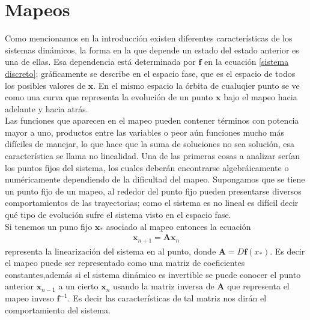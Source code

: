 \section{Mapeos}
Como mencionamos en la introducción existen diferentes características de los sistemas dinámicos, la forma en la que depende un estado del estado anterior es una de ellas. Esa dependencia está determinada por $\mathbf{f}$ en la ecuación \ref{sistema discreto}; gráficamente se describe en el espacio fase, que es el espacio de todos los posibles valores de $\pmb x$. En el mismo espacio la órbita de cualuqier punto se ve como una curva que representa la evolución de un punto $\pmb x$ bajo el mapeo hacia adelante y hacia atrás. \\

Las funciones que aparecen en el mapeo pueden contener términos con potencia mayor a uno, productos entre las variables o peor aún funciones mucho más difíciles de manejar, lo que hace que la suma de soluciones no sea solución, esa característica se llama no linealidad. Una de las primeras cosas a analizar serían los puntos fijos del sistema, los cuales deberán encontrarse algebráicamente o numéricamente dependiendo de la dificultad del mapeo. Supongamos que se tiene un punto fijo de un mapeo, al rededor del punto fijo pueden presentarse diversos comportamientos de las trayectorias; como el sistema es no lineal es difícil decir qué tipo de evolución sufre el sistema visto en el espacio fase.\\


Si tenemos un puno fijo $\pmb x_{*}$ asociado al mapeo entonces la ecuación
\begin{eqnarray}
\pmb x_{n+1} =\mathbf{A}\pmb x_{n}
\end{eqnarray}
representa la linearización del sistema en al punto, donde $\mathbf{A}=D\mathbf{f}(x_{*})$. Es decir el mapeo puede ser representado como una matriz de coeficientes constantes,además si el sistema dinámico es invertible se puede conocer el punto anterior $\pmb x_{n-1}$ a un cierto $\pmb x_{n}$ usando la matriz inversa de $\mathbf{A}$ que representa el mapeo inveso $\mathbf{f}^{-1}$. Es decir las características de tal matriz nos dirán el comportamiento del sistema. \\

